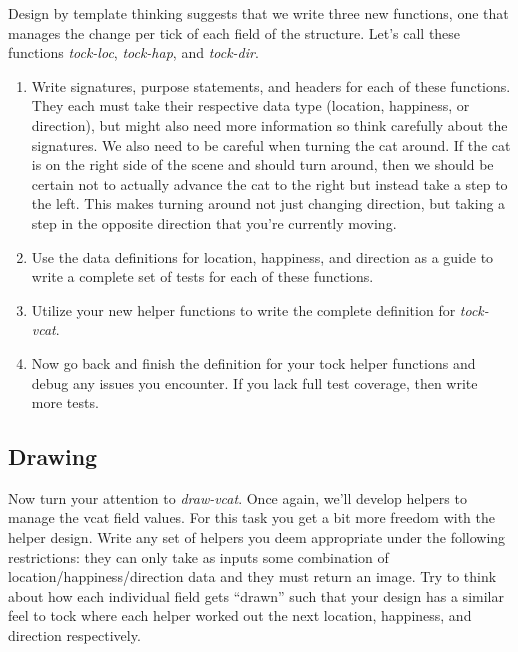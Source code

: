 \documentclass[nobib]{tufte-handout}
\begin{document}
Design by template thinking suggests that we write three new functions, one that manages the change per tick of each field of the structure. Let's call these functions \textit{tock-loc}, \textit{tock-hap}, and \textit{tock-dir}.
\begin{enumerate}
  \item Write signatures, purpose statements, and headers for each of these functions. They each must take their respective data type (location, happiness, or direction), but might also need more information so think carefully about the signatures. We also need to be careful when turning the cat around. If the cat is on the right side of the scene and should turn around, then we should be certain not to actually advance the cat to the right but instead take a step to the left. This makes turning around not just changing direction, but taking a step in the opposite direction that you're currently moving.

  \item Use the data definitions for location, happiness, and direction as a guide to write a complete set of tests for each of these functions.

  \item Utilize your new helper functions to write the complete definition for \textit{tock-vcat}.

  \item Now go back and finish the definition for your tock helper functions and debug any issues you encounter. If you lack full test coverage, then write more tests.
\end{enumerate}

\subsection*{Drawing}

Now turn your attention to \textit{draw-vcat}. Once again, we'll develop helpers to manage the vcat field values. For this task you get a bit more freedom with the helper design. Write any set of helpers you deem appropriate under the following restrictions: they can only take as inputs some combination of location/happiness/direction data and they must return an image. Try to think about how each individual field gets ``drawn'' such that your design has a similar feel to tock where each helper worked out the next location, happiness, and direction respectively.
\end{document}
